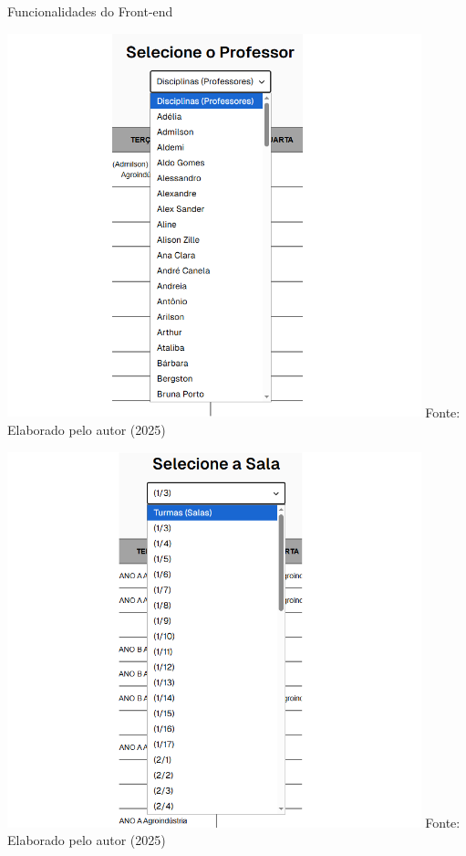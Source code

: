 \begin{frame}{Funcionalidades do Front-end}
    \begin{minipage}{0.48\textwidth}
        \centering
        \includegraphics[width=0.9\textwidth]{figuras/front-18.png}
        \small Fonte: Elaborado pelo autor (2025)
    \end{minipage}
    \hfill
    \begin{minipage}{0.48\textwidth}
        \centering
        \includegraphics[width=0.9\textwidth]{figuras/front-19.png}
        \small Fonte: Elaborado pelo autor (2025)
    \end{minipage}
\end{frame}

